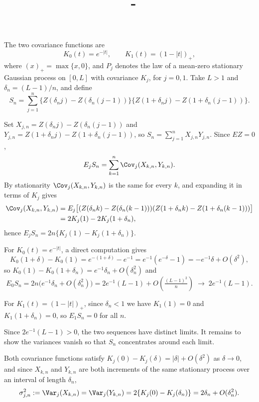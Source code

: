 \documentclass[answers,12pt,addpoints]{exam}
\author{\name}
\title{\course \ - \assignment}
\begin{document}
\maketitle

\newpage
\begin{questions}

\begin{solution}
The two covariance functions are
\[
K_0(t)=e^{-|t|},\qquad K_1(t)=(1-|t|)_+,
\]
where $(x)_+=\max\{x,0\}$, and $P_j$ denotes the law of a mean-zero
stationary Gaussian process on $[0,L]$ with covariance $K_j$, for
$j=0,1$.  Take $L>1$ and $\delta_n=(L-1)/n$, and define
\[
S_n=\sum_{j=1}^n
\bigl\{Z(\delta_n j)-Z(\delta_n(j-1))\bigr\}
\bigl\{Z(1+\delta_n j)-Z(1+\delta_n(j-1))\bigr\}.
\]

Set $X_{j,n}=Z(\delta_n j)-Z(\delta_n(j-1))$ and
$Y_{j,n}=Z(1+\delta_n j)-Z(1+\delta_n(j-1))$, so
$S_n=\sum_{j=1}^n X_{j,n}Y_{j,n}$.  Since $EZ=0$,
\[
E_j S_n = \sum_{k=1}^n \Cov_j(X_{k,n}, Y_{k,n}).
\]
By stationarity $\Cov_j(X_{k,n},Y_{k,n})$ is the same for every $k$,
and expanding it in terms of $K_j$ gives
\begin{align*}
\Cov_j(X_{k,n},Y_{k,n})
&= E_j\bigl[(Z(\delta_n k)-Z(\delta_n(k-1)))
            (Z(1+\delta_n k)-Z(1+\delta_n(k-1)))\bigr]\\
&= 2K_j(1)-2K_j(1+\delta_n),
\end{align*}
hence $E_j S_n = 2n\{K_j(1)-K_j(1+\delta_n)\}$.

For $K_0(t)=e^{-|t|}$, a direct computation gives
\[
K_0(1+\delta)-K_0(1) = e^{-(1+\delta)}-e^{-1}
= e^{-1}(e^{-\delta}-1)
= -e^{-1}\delta + O(\delta^2),
\]
so $K_0(1)-K_0(1+\delta_n)=e^{-1}\delta_n+O(\delta_n^2)$ and
\[
E_0 S_n = 2n\bigl(e^{-1}\delta_n+O(\delta_n^2)\bigr)
= 2e^{-1}(L-1)+O\!\left(\tfrac{(L-1)^2}{n}\right)
\;\longrightarrow\; 2e^{-1}(L-1).
\]

For $K_1(t)=(1-|t|)_+$, since $\delta_n < 1$ we have $K_1(1)=0$ and
$K_1(1+\delta_n)=0$, so $E_1 S_n = 0$ for all $n$.

Since $2e^{-1}(L-1)>0$, the two sequences have distinct limits.
It remains to show the variances vanish so that $S_n$ concentrates
around each limit.

Both covariance functions satisfy $K_j(0)-K_j(\delta)=|\delta|+O(\delta^2)$
as $\delta\to0$, and since $X_{k,n}$ and $Y_{k,n}$ are both increments
of the same stationary process over an interval of length $\delta_n$,
\[
\sigma_{j,n}^2 := \Var_j(X_{k,n})=\Var_j(Y_{k,n})
= 2\{K_j(0)-K_j(\delta_n)\} = 2\delta_n+O(\delta_n^2).
\]


\end{solution}
\end{questions}
\end{document}
